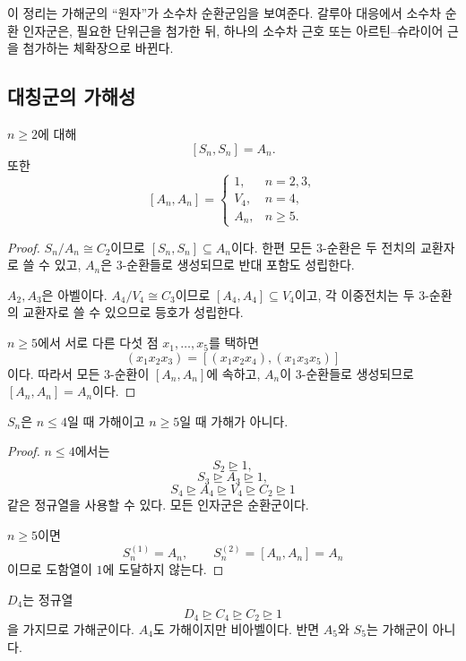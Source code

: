 이 정리는 가해군의 ``원자''가 소수차 순환군임을 보여준다. 갈루아 대응에서 소수차 순환 인자군은, 필요한 단위근을 첨가한 뒤, 하나의 소수차 근호 또는 아르틴--슈라이어 근을 첨가하는 체확장으로 바뀐다.

\subsection{대칭군의 가해성}

\begin{proposition}
$n\ge2$에 대해
\[
  [S_n,S_n]=A_n.
\]
또한
\[
  [A_n,A_n]=
  \begin{cases}
    1,&n=2,3,\\
    V_4,&n=4,\\
    A_n,&n\ge5.
  \end{cases}
\]
\end{proposition}

\begin{proof}
$S_n/A_n\cong C_2$이므로 $[S_n,S_n]\subseteq A_n$이다. 한편 모든 $3$-순환은 두 전치의 교환자로 쓸 수 있고, $A_n$은 $3$-순환들로 생성되므로 반대 포함도 성립한다.

$A_2,A_3$은 아벨이다. $A_4/V_4\cong C_3$이므로 $[A_4,A_4]\subseteq V_4$이고, 각 이중전치는 두 $3$-순환의 교환자로 쓸 수 있으므로 등호가 성립한다.

$n\ge5$에서 서로 다른 다섯 점 $x_1,\dots,x_5$를 택하면
\[
  (x_1x_2x_3)
  =[(x_1x_2x_4),(x_1x_3x_5)]
\]
이다. 따라서 모든 $3$-순환이 $[A_n,A_n]$에 속하고, $A_n$이 $3$-순환들로 생성되므로 $[A_n,A_n]=A_n$이다.
\end{proof}

\begin{corollary}
\label{cor:symmetric-solvability}
$S_n$은 $n\le4$일 때 가해이고 $n\ge5$일 때 가해가 아니다.
\end{corollary}

\begin{proof}
$n\le4$에서는
\[
  S_2\trianglerighteq1,
\]
\[
  S_3\trianglerighteq A_3\trianglerighteq1,
\]
\[
  S_4\trianglerighteq A_4\trianglerighteq V_4
  \trianglerighteq C_2\trianglerighteq1
\]
같은 정규열을 사용할 수 있다. 모든 인자군은 순환군이다.

$n\ge5$이면
\[
  S_n^{(1)}=A_n,
  \qquad
  S_n^{(2)}=[A_n,A_n]=A_n
\]
이므로 도함열이 $1$에 도달하지 않는다.
\end{proof}

\begin{example}
$D_4$는 정규열
\[
  D_4\trianglerighteq C_4\trianglerighteq C_2
  \trianglerighteq1
\]
을 가지므로 가해군이다. $A_4$도 가해이지만 비아벨이다. 반면 $A_5$와 $S_5$는 가해군이 아니다.
\end{example}

